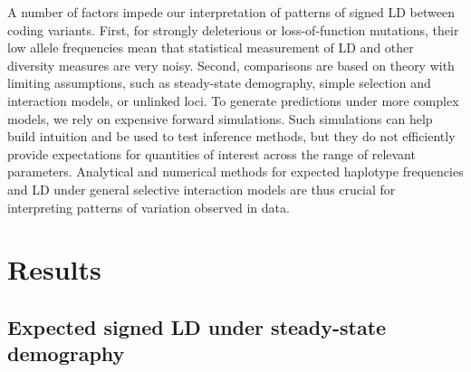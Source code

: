\documentclass[]{article}
\begin{document}
A number of factors impede our interpretation of patterns of signed LD between
coding variants. First, for strongly deleterious or loss-of-function mutations,
their low allele frequencies mean that statistical measurement of LD
and other diversity measures are very noisy. Second, comparisons are based on
theory with limiting assumptions, such as steady-state demography, simple
selection and interaction models, or unlinked loci. To generate predictions
under more complex models, we rely on expensive forward simulations. Such
simulations can help build intuition and be used to test inference methods, but
they do not efficiently provide expectations for quantities of interest across
the range of relevant parameters. Analytical and numerical methods for expected
haplotype frequencies and LD under general selective interaction models are
thus crucial for interpreting patterns of variation observed in data.

\section{Results}\label{sec:results}

\subsection{Expected signed LD under steady-state demography}
\label{sec:signed-ld}
\end{document}
